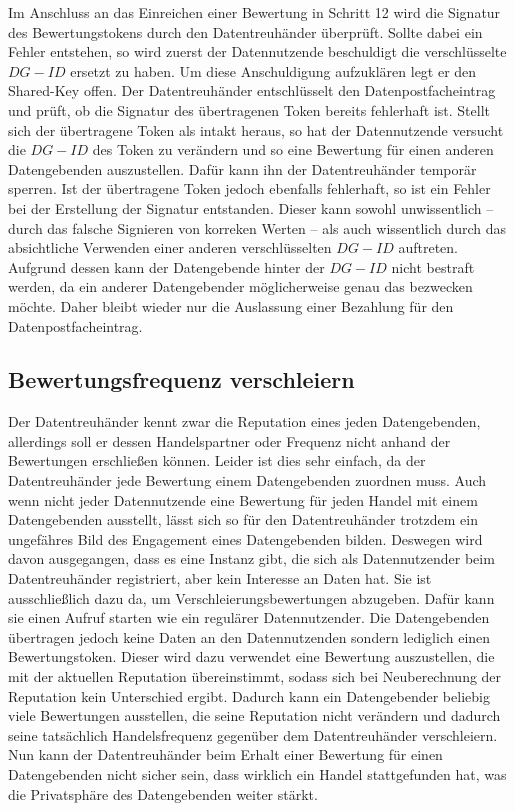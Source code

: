 \documentclass[
	fontsize=12pt,
	headings=small,
	parskip=half,           %
	bibliography=totoc,
	numbers=noenddot,       %
	open=any,               %
]{scrreprt}
\begin{document}
\begin{enumerate}
    Im Anschluss an das Einreichen einer Bewertung in Schritt 12 wird die Signatur des Bewertungstokens durch den Datentreuhänder überprüft. Sollte dabei ein Fehler entstehen, so wird zuerst der Datennutzende beschuldigt die verschlüsselte $DG-ID$ ersetzt zu haben. Um diese Anschuldigung aufzuklären legt er den Shared-Key offen. Der Datentreuhänder entschlüsselt den Datenpostfacheintrag und prüft, ob die Signatur des übertragenen Token bereits fehlerhaft ist. Stellt sich der übertragene Token als intakt heraus, so hat der Datennutzende versucht die $DG-ID$ des Token zu verändern und so eine Bewertung für einen anderen Datengebenden auszustellen. Dafür kann ihn der Datentreuhänder temporär sperren. Ist der übertragene Token jedoch ebenfalls fehlerhaft, so ist ein Fehler bei der Erstellung der Signatur entstanden. Dieser kann sowohl unwissentlich -- durch das falsche Signieren von korreken Werten -- als auch wissentlich durch das absichtliche Verwenden einer anderen verschlüsselten $DG-ID$ auftreten. Aufgrund dessen kann der Datengebende hinter der $DG-ID$ nicht bestraft werden, da ein anderer Datengebender möglicherweise genau das bezwecken möchte. Daher bleibt wieder nur die Auslassung einer Bezahlung für den Datenpostfacheintrag.
\end{enumerate}

\subsection{Bewertungsfrequenz verschleiern}
\label{sec:ratingObfuscation}
Der Datentreuhänder kennt zwar die Reputation eines jeden Datengebenden, allerdings soll er dessen Handelspartner oder Frequenz nicht anhand der Bewertungen erschließen können. Leider ist dies sehr einfach, da der Datentreuhänder jede Bewertung einem Datengebenden zuordnen muss. Auch wenn nicht jeder Datennutzende eine Bewertung für jeden Handel mit einem Datengebenden ausstellt, lässt sich so für den Datentreuhänder trotzdem ein ungefähres Bild des Engagement eines Datengebenden bilden. Deswegen wird davon ausgegangen, dass es eine Instanz gibt, die sich als Datennutzender beim Datentreuhänder registriert, aber kein Interesse an Daten hat. Sie ist ausschließlich dazu da, um Verschleierungsbewertungen abzugeben. Dafür kann sie einen Aufruf starten wie ein regulärer Datennutzender. Die Datengebenden übertragen jedoch keine Daten an den Datennutzenden sondern lediglich einen Bewertungstoken. Dieser wird dazu verwendet eine Bewertung auszustellen, die mit der aktuellen Reputation übereinstimmt, sodass sich bei Neuberechnung der Reputation kein Unterschied ergibt. Dadurch kann ein Datengebender beliebig viele Bewertungen ausstellen, die seine Reputation nicht verändern und dadurch seine tatsächlich Handelsfrequenz gegenüber dem Datentreuhänder verschleiern. Nun kann der Datentreuhänder beim Erhalt einer Bewertung für einen Datengebenden nicht sicher sein, dass wirklich ein Handel stattgefunden hat, was die Privatsphäre des Datengebenden weiter stärkt.\\
\end{document}
